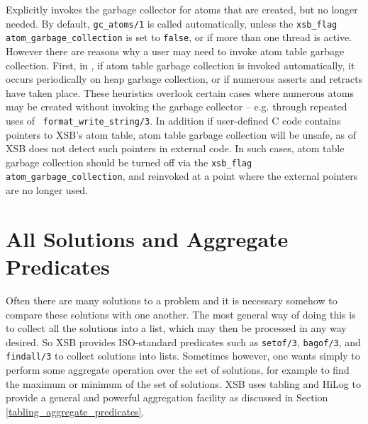 \begin{description}
%
Explicitly invokes the garbage collector for atoms that are created,
but no longer needed.  By default, {\tt gc\_atoms/1} is called
automatically, unless the {\tt xsb\_flag} {\tt
  atom\_garbage\_collection} is set to {\tt false}, or if more than
one thread is active.  However there are reasons why a user may need
to invoke atom table garbage collection.  First, in \version{}, if
atom table garbage collection is invoked automatically, it occurs
periodically on heap garbage collection, or if numerous asserts and
retracts have taken place.  These heuristics overlook certain cases
where numerous atoms may be created without invoking the garbage
collector -- e.g. through repeated uses of {\tt
  format\_write\_string/3}.  In addition if user-defined C code
contains pointers to XSB's atom table, atom table garbage collection
will be unsafe, as \version{} of XSB does not detect such pointers in
external code.  In such cases, atom table garbage collection should be
turned off via the {\tt xsb\_flag} {\tt atom\_garbage\_collection},
and reinvoked at a point where the external pointers are no longer
used.

\end{description}


\section{All Solutions and Aggregate Predicates}
 
Often there are many solutions to a problem and it is necessary
somehow to compare these solutions with one another.  The most general
way of doing this is to collect all the solutions into a list, which
may then be processed in any way desired.  So XSB provides
ISO-standard predicates such as {\tt setof/3}, {\tt bagof/3}, and {\tt
findall/3} to collect solutions into lists.  Sometimes however, one
wants simply to perform some aggregate operation over the set of
solutions, for example to find the maximum or minimum of the set of
solutions.  XSB uses tabling and HiLog to provide a general and
powerful aggregation facility as discussed in Section
\ref{tabling_aggregate_predicates}.

